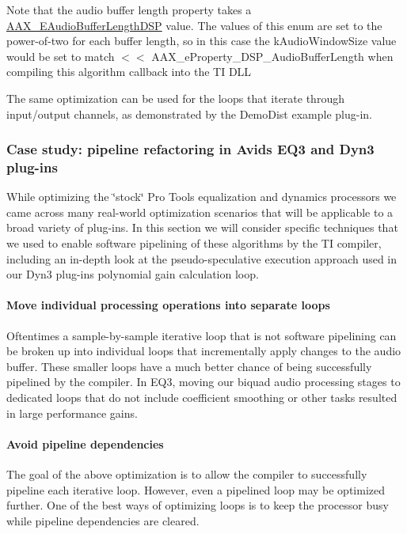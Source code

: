 Note that the audio buffer length property takes a \mbox{\hyperlink{a00491_ab33e0f1ecf04ca4161fa8d8de5845d67}{A\+A\+X\+\_\+\+E\+Audio\+Buffer\+Length\+D\+SP}} value. The values of this enum are set to the power-\/of-\/two for each buffer length, so in this case the {\ttfamily k\+Audio\+Window\+Size} value would be set to match { $<$$<$ A\+A\+X\+\_\+e\+Property\+\_\+\+D\+S\+P\+\_\+\+Audio\+Buffer\+Length} when compiling this algorithm callback into the TI D\+LL

The same optimization can be used for the loops that iterate through input/output channels, as demonstrated by the Demo\+Dist example plug-\/in.

\hypertarget{a00832_subsection__case_study_pipeline_refactoring_in_avids_eq3_and_dyn3_plugins}{}\subsubsection{Case study\+: pipeline refactoring in Avid\textquotesingle{}s E\+Q3 and Dyn3 plug-\/ins}\label{a00832_subsection__case_study_pipeline_refactoring_in_avids_eq3_and_dyn3_plugins}
 While optimizing the \char`\"{}stock\char`\"{} Pro Tools equalization and dynamics processors we came across many real-\/world optimization scenarios that will be applicable to a broad variety of plug-\/ins. In this section we will consider specific techniques that we used to enable software pipelining of these algorithms by the TI compiler, including an in-\/depth look at the pseudo-\/speculative execution approach used in our Dyn3 plug-\/in\textquotesingle{}s polynomial gain calculation loop.

\hypertarget{a00832_subsubsection__move_individual_processing_operations_into_separate_loops_}{}\paragraph{Move individual processing operations into separate loops}\label{a00832_subsubsection__move_individual_processing_operations_into_separate_loops_}
 Oftentimes a sample-\/by-\/sample iterative loop that is not software pipelining can be broken up into individual loops that incrementally apply changes to the audio buffer. These smaller loops have a much better chance of being successfully pipelined by the compiler. In E\+Q3, moving our biquad audio processing stages to dedicated loops that do not include coefficient smoothing or other tasks resulted in large performance gains.

\hypertarget{a00832_subsubsection__avoid_pipeline_dependencies_}{}\paragraph{Avoid pipeline dependencies}\label{a00832_subsubsection__avoid_pipeline_dependencies_}
 The goal of the above optimization is to allow the compiler to successfully pipeline each iterative loop. However, even a pipelined loop may be optimized further. One of the best ways of optimizing loops is to keep the processor busy while pipeline dependencies are cleared.

